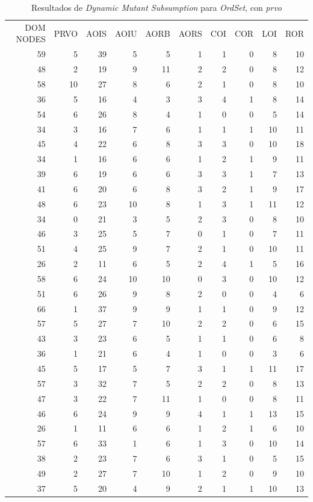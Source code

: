 \begin{table}[]
	\caption{Resultados de \emph{Dynamic Mutant Subsumption} para \emph{OrdSet}, con \emph{prvo}}
	\label{tables.results.subsumption.ordset.prvo}
	\centering
	\scriptsize
	\def\arraystretch{0.95}
	\setlength\tabcolsep{0.5mm}
	\begin{tabular}{rrrrrrrrrr}
		DOM NODES & PRVO & AOIS & AOIU & AORB & AORS & COI & COR & LOI & ROR \\
		59 & 5 & 39 & 5 & 5 & 1 & 1 & 0 & 8 & 10 \\
		48 & 2 & 19 & 9 & 11 & 2 & 2 & 0 & 8 & 12 \\
		58 & 10 & 27 & 8 & 6 & 2 & 1 & 0 & 8 & 10 \\
		36 & 5 & 16 & 4 & 3 & 3 & 4 & 1 & 8 & 14 \\
		54 & 6 & 26 & 8 & 4 & 1 & 0 & 0 & 5 & 14 \\
		34 & 3 & 16 & 7 & 6 & 1 & 1 & 1 & 10 & 11 \\
		45 & 4 & 22 & 6 & 8 & 3 & 3 & 0 & 10 & 18 \\
		34 & 1 & 16 & 6 & 6 & 1 & 2 & 1 & 9 & 11 \\
		39 & 6 & 19 & 6 & 6 & 3 & 3 & 1 & 7 & 13 \\
		41 & 6 & 20 & 6 & 8 & 3 & 2 & 1 & 9 & 17 \\
		48 & 6 & 23 & 10 & 8 & 1 & 3 & 1 & 11 & 12 \\
		34 & 0 & 21 & 3 & 5 & 2 & 3 & 0 & 8 & 10 \\
		46 & 3 & 25 & 5 & 7 & 0 & 1 & 0 & 7 & 11 \\
		51 & 4 & 25 & 9 & 7 & 2 & 1 & 0 & 10 & 11 \\
		26 & 2 & 11 & 6 & 5 & 2 & 4 & 1 & 5 & 16 \\
		58 & 6 & 24 & 10 & 10 & 0 & 3 & 0 & 10 & 12 \\
		51 & 6 & 26 & 9 & 8 & 2 & 0 & 0 & 4 & 6 \\
		66 & 1 & 37 & 9 & 9 & 1 & 1 & 0 & 9 & 12 \\
		57 & 5 & 27 & 7 & 10 & 2 & 2 & 0 & 6 & 15 \\
		43 & 3 & 23 & 6 & 5 & 1 & 1 & 0 & 6 & 8 \\
		36 & 1 & 21 & 6 & 4 & 1 & 0 & 0 & 3 & 6 \\
		45 & 5 & 17 & 5 & 7 & 3 & 1 & 1 & 11 & 17 \\
		57 & 3 & 32 & 7 & 5 & 2 & 2 & 0 & 8 & 13 \\
		47 & 3 & 22 & 7 & 11 & 1 & 0 & 0 & 8 & 11 \\
		46 & 6 & 24 & 9 & 9 & 4 & 1 & 1 & 13 & 15 \\
		26 & 1 & 11 & 6 & 6 & 1 & 2 & 1 & 6 & 10 \\
		57 & 6 & 33 & 1 & 6 & 1 & 3 & 0 & 10 & 14 \\
		38 & 2 & 23 & 7 & 6 & 3 & 1 & 0 & 5 & 15 \\
		49 & 2 & 27 & 7 & 10 & 1 & 2 & 0 & 9 & 10 \\
		37 & 5 & 20 & 4 & 9 & 2 & 1 & 1 & 10 & 13
	\end{tabular}
\end{table}